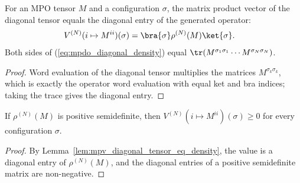 \begin{lemma}
    \label{lem:mpv_diagonal_tensor_eq_density}
    \leanok
    For an MPO tensor $M$ and a configuration $\sigma$, the matrix product vector of
    the diagonal tensor equals the diagonal entry of the generated operator:
    \begin{align}
        V^{(N)}(i\mapsto M^{ii})(\sigma)
         & =\bra{\sigma}\rho^{(N)}(M)\ket{\sigma}.
        \label{eq:mpdo_diagonal_density}
    \end{align}
    Both sides of (\ref{eq:mpdo_diagonal_density}) equal
    $\tr(M^{\sigma_1\sigma_1}\cdots M^{\sigma_N\sigma_N})$.
\end{lemma}
\begin{proof}\leanok
    Word evaluation of the diagonal tensor multiplies the matrices
    $M^{\sigma_k\sigma_k}$, which is exactly the operator word evaluation with equal
    ket and bra indices; taking the trace gives the diagonal entry.
\end{proof}

\begin{lemma}
    \label{lem:mpv_diagonal_tensor_nonneg}
    \leanok
    If $\rho^{(N)}(M)$ is positive semidefinite, then
    $V^{(N)}(i\mapsto M^{ii})(\sigma)\geq0$ for every configuration
    $\sigma$.
\end{lemma}
\begin{proof}\leanok
    By Lemma~\ref{lem:mpv_diagonal_tensor_eq_density}, the value is a diagonal
    entry of $\rho^{(N)}(M)$, and the diagonal entries of a positive semidefinite
    matrix are non-negative.
\end{proof}

